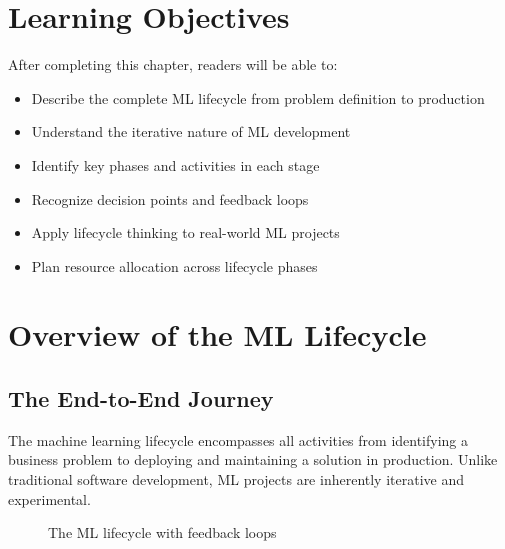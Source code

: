 \section{Learning Objectives}

After completing this chapter, readers will be able to:
\begin{itemize}
    \item Describe the complete ML lifecycle from problem definition to production
    \item Understand the iterative nature of ML development
    \item Identify key phases and activities in each stage
    \item Recognize decision points and feedback loops
    \item Apply lifecycle thinking to real-world ML projects
    \item Plan resource allocation across lifecycle phases
\end{itemize}

\section{Overview of the ML Lifecycle}

\subsection{The End-to-End Journey}

The machine learning lifecycle encompasses all activities from identifying a business problem to deploying and maintaining a solution in production. Unlike traditional software development, ML projects are inherently iterative and experimental.

\begin{figure}[h]
\centering
{}
\caption{The ML lifecycle with feedback loops}
\label{fig:ml_lifecycle}
\end{figure}

